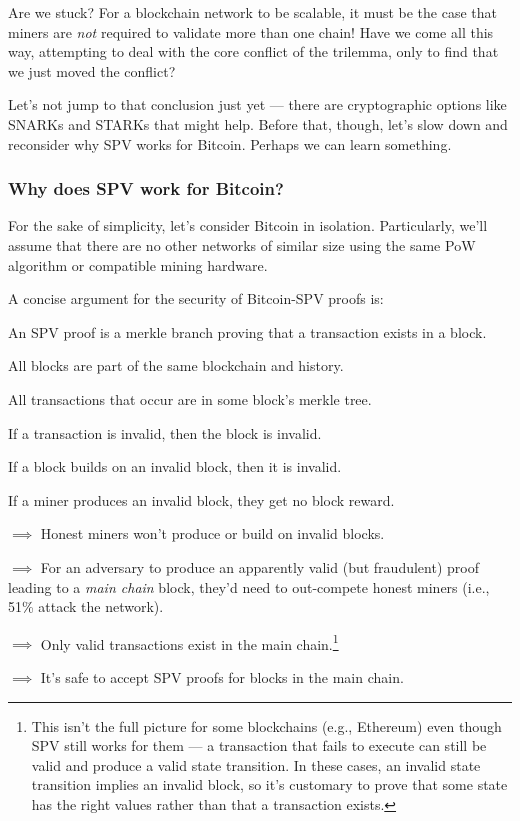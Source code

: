 Are we stuck?
For a blockchain network to be scalable, it must be the case that miners are \emph{not} required to validate more than one chain!
Have we come all this way, attempting to deal with the core conflict of the trilemma, only to find that we just moved the conflict?

Let's not jump to that conclusion just yet --- there are cryptographic options like SNARKs and STARKs that might help.
Before that, though, let's slow down and reconsider why SPV works for Bitcoin.
Perhaps we can learn something.

\subsubsection{Why does SPV work for Bitcoin?}

For the sake of simplicity, let's consider Bitcoin in isolation.
Particularly, we'll assume that there are no other networks of similar size using the same PoW algorithm or compatible mining hardware.

A concise argument for the security of Bitcoin-SPV proofs is:

\begin{argumentslist}
    \item An SPV proof is a merkle branch proving that a transaction exists in a block.
    \item All blocks are part of the same blockchain and history.
    \item All transactions that occur are in some block's merkle tree.
    \item If a transaction is invalid, then the block is invalid.
    \item If a block builds on an invalid block, then it is invalid.
    \item If a miner produces an invalid block, they get no block reward.
    \item $\implies$ Honest miners won't produce or build on invalid blocks.
    \item \label{prem:spv-7} $\implies$ For an adversary to produce an apparently valid (but fraudulent) proof leading to a \emph{main chain} block, they'd need to out-compete honest miners (i.e., 51\% attack the network).
    \item \label{prem:spv-8} $\implies$ Only valid transactions exist in the main chain.\footnote{
        This isn't the full picture for some blockchains (e.g., Ethereum) even though SPV still works for them --- a transaction that fails to execute can still be valid and produce a valid state transition.
        In these cases, an invalid state transition implies an invalid block, so it's customary to prove that some state has the right values rather than that a transaction exists.
    }
    \item $\implies$ It's safe to accept SPV proofs for blocks in the main chain.
\end{argumentslist}

